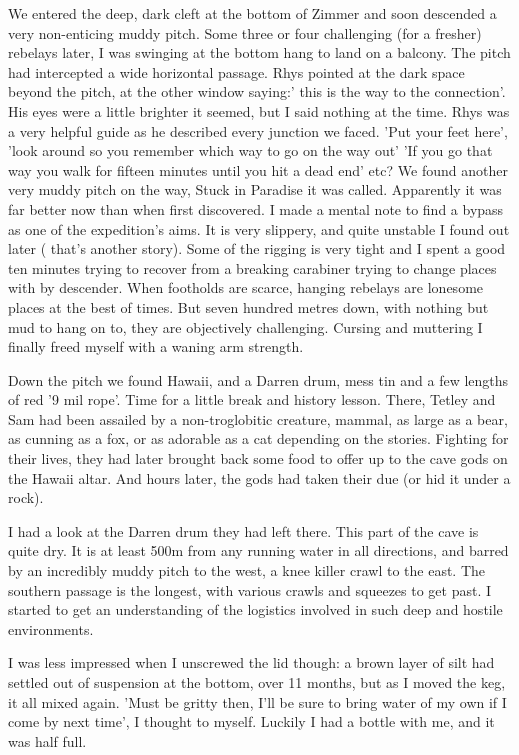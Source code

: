 \documentclass[onecolumn]{book}
\begin{document}
We entered the deep, dark cleft at the bottom of Zimmer and soon descended a very non-enticing muddy pitch. Some three or four challenging (for a fresher) rebelays later, I was swinging at the bottom hang to land on a balcony. The pitch had intercepted a wide horizontal passage. Rhys pointed at the dark space beyond the pitch, at the other window saying:' this is the way to the connection'. His eyes were a little brighter it seemed, but I said nothing at the time. Rhys was a very helpful guide as he described every junction we faced. 'Put your feet here', 'look around so you remember which way to go on the way out' 'If you go that way you walk for fifteen minutes until you hit a dead end' etc? We found another very muddy pitch on the way, Stuck in Paradise it was called. Apparently it was far better now than when first discovered. I made a mental note to find a bypass as one of the expedition's aims. It is very slippery, and quite unstable I found out later ( that's another story). Some of the rigging is very tight and I spent a good ten minutes trying to recover from a breaking carabiner trying to change places with by descender. When footholds are scarce, hanging rebelays are lonesome places at the best of times. But seven hundred metres down, with nothing but mud to hang on to, they are objectively challenging. Cursing and muttering I finally freed myself with a waning arm strength.

Down the pitch we found Hawaii, and a Darren drum, mess tin and a few lengths of red '9 mil rope'. Time for a little break and history lesson. There, Tetley and Sam had been assailed by a non-troglobitic creature, mammal, as large as a bear, as cunning as a fox, or as adorable as a cat depending on the stories. Fighting for their lives, they had later brought back some food to offer up to the cave gods on the Hawaii altar. And hours later, the gods had taken their due (or hid it under a rock). 

I had a look at the Darren drum they had left there. This part of the cave is quite dry. It is at least 500m from any running water in all directions, and barred by an incredibly muddy pitch to the west, a knee killer crawl to the east. The southern passage is the longest, with various crawls and squeezes to get past. I started to get an understanding of the logistics involved in such deep and hostile environments.


I was less impressed when I unscrewed the lid though: a brown layer of silt had settled out of suspension at the bottom, over 11 months, but as I moved the keg, it all mixed again. 'Must be gritty then, I'll be sure to bring water of my own if I come by next time', I thought to myself. Luckily I had a bottle with me, and it was half full.
\end{document}
